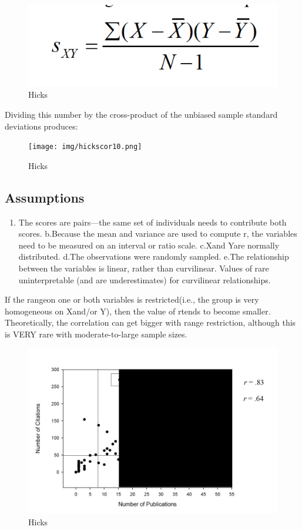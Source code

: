 \documentclass[]{book}
\providecommand{\tightlist}{%
  \setlength{\itemsep}{0pt}\setlength{\parskip}{0pt}}
\theoremstyle{definition}
\theoremstyle{definition}
\theoremstyle{definition}
\theoremstyle{remark}
\begin{document}
{\begin{figure}
\centering
\includegraphics{img/hickscor9a.png}
\caption{Hicks}
\end{figure}

Dividing this number by the cross-product of the unbiased sample
standard deviations produces:

\begin{figure}
\centering
\texttt{[image: img/hickscor10.png]}
\caption{Hicks}
\end{figure}

\subsection{Assumptions}\label{assumptions}

\begin{enumerate}
\def\labelenumi{\alph{enumi}.}
\tightlist
\item
  The scores are pairs---the same set of individuals needs to contribute
  both scores. b.Because the mean and variance are used to compute r,
  the variables need to be measured on an interval or ratio scale.
  c.Xand Yare normally distributed. d.The observations were randomly
  sampled. e.The relationship between the variables is linear, rather
  than curvilinear. Values of rare uninterpretable (and are
  underestimates) for curvilinear relationships.
\end{enumerate}

If the rangeon one or both variables is restricted(i.e., the group is
very homogeneous on Xand/or Y), then the value of rtends to become
smaller. Theoretically, the correlation can get bigger with range
restriction, although this is VERY rare with moderate-to-large sample
sizes.

\begin{figure}
\centering
\includegraphics{img/hickscor11.png}
\caption{Hicks}
\end{figure}

}
\end{document}
